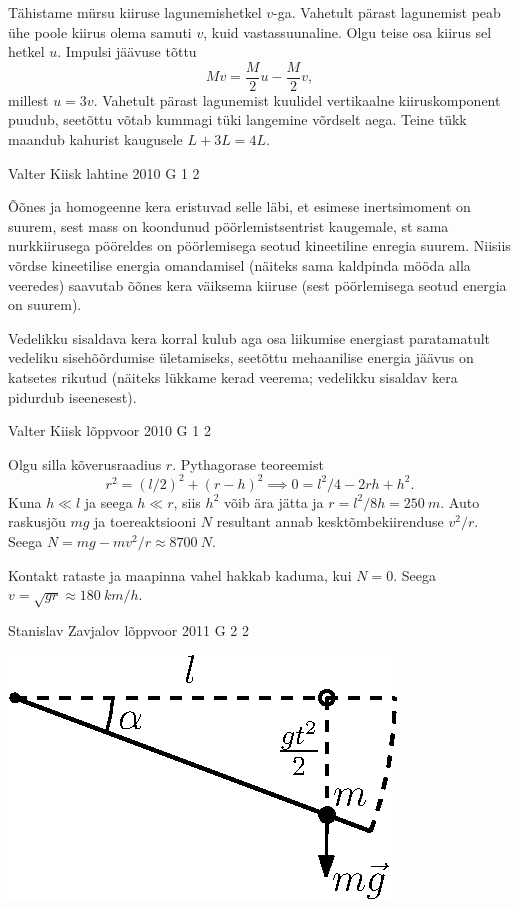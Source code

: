 \documentclass[11pt, twoside]{article}
\begin{document}
{{\ifSolution
Tähistame mürsu kiiruse lagunemishetkel $v$-ga. Vahetult pärast lagunemist peab ühe poole kiirus olema samuti $v$, kuid vastassuunaline. Olgu teise osa kiirus sel hetkel $u$. Impulsi jäävuse tõttu
\[
Mv = \frac{M}{2}u - \frac{M}{2}v,
\]
millest $u=3v$. Vahetult pärast lagunemist kuulidel vertikaalne kiiruskomponent puudub, seetõttu võtab kummagi tüki langemine võrdselt aega. Teine
tükk maandub kahurist kaugusele $L + 3L = 4L$.
\fi
}

{Valter Kiisk} %
{lahtine} %
{2010} %
{G 1} %
{2} %
{

\ifSolution
Õõnes ja homogeenne kera eristuvad selle läbi, et esimese inertsimoment on suurem, sest
mass on koondunud pöörlemistsentrist kaugemale, st sama nurkkiirusega pööreldes on pöörlemisega seotud kineetiline enregia suurem. 
Niisiis võrdse kineetilise energia omandamisel (näiteks sama kaldpinda mööda alla veeredes) saavutab 
õõnes kera väiksema kiiruse (sest pöörlemisega seotud energia on suurem). 

Vedelikku sisaldava kera korral kulub aga osa liikumise energiast paratamatult
vedeliku sisehõõrdumise ületamiseks, seetõttu mehaanilise energia jäävus on katsetes
rikutud (näiteks lükkame kerad veerema; vedelikku sisaldav kera pidurdub iseenesest).
\fi
}

{Valter Kiisk} %
{lõppvoor} %
{2010} %
{G 1} %
{2} %
{

\ifSolution
Olgu
silla kõverusraadius $r$. Pythagorase teoreemist
\[
r^2=(l/2)^2+(r-h)^2\implies 0=l^2/4-2rh+h^2.
\]
Kuna $h\ll l$ ja seega $h\ll r$, siis $h^2$ võib ära jätta ja $r=l^2/8h=\SI{250}{m}$.
Auto raskusjõu $mg$ ja toereaktsiooni $N$ resultant annab kesktõmbekiirenduse $v^2/r$.
Seega $N=mg-mv^2/r\approx\SI{8700}{N}$.

Kontakt rataste ja maapinna vahel hakkab kaduma, kui $N=0$. Seega $v=\sqrt{gr}\approx
\SI{180}{km/h}$.
\fi
}

{Stanislav Zavjalov} %
{lõppvoor} %
{2011} %
{G 2} %
{2} %
{

\ifSolution
\begin{center}
	\includegraphics[width = 0.5\linewidth]{2011-v3g-02-varras_lah.eps}
\end{center}

}}
\end{document}
